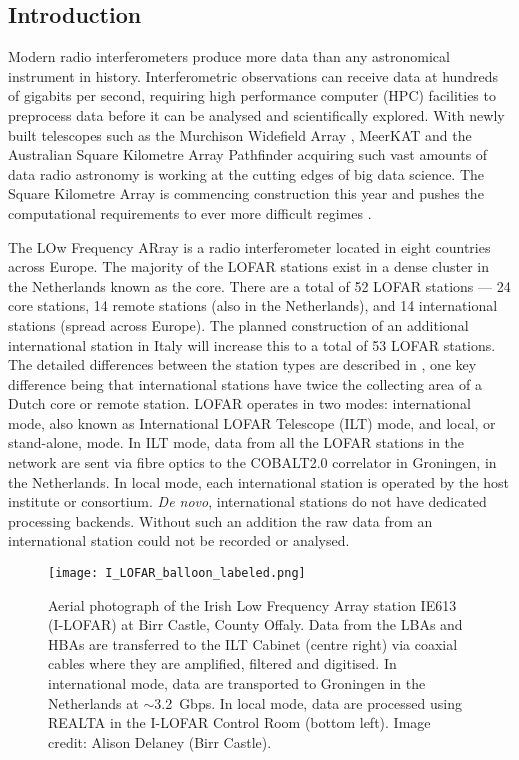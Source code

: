 
\subsection{Introduction}
\label{sec:intro}
Modern radio interferometers produce more data than any astronomical instrument in history. Interferometric observations can receive data at hundreds of gigabits per second, requiring high performance computer (HPC) facilities to preprocess data before it can be analysed and scientifically explored. With newly built telescopes such as the Murchison Widefield Array \citep[MWA;][]{Lonsdale2009}, MeerKAT \citep{Jonas2016} and the Australian Square Kilometre Array Pathfinder \citep[ASKAP;][]{Johnston2008} acquiring such vast amounts of data \citep[up to $300$~Gbps;][]{Voronkov2020, Lonsdale2009} radio astronomy is working at the cutting edges of big data science. The Square Kilometre Array \citep{McMullin2020} is commencing construction this year and pushes the computational requirements to ever more difficult regimes \citep{Scaife2020}.

The LOw Frequency ARray \citep[LOFAR;][]{VanHaarlem2013} is a radio interferometer located in eight countries across Europe. The majority of the LOFAR stations exist in a dense cluster in the Netherlands known as the core. There are a total of 52 LOFAR stations --- 24 core stations, 14 remote stations (also in the Netherlands), and 14 international stations (spread across Europe). The planned construction of an additional international station in Italy will increase this to a total of 53 LOFAR stations. The detailed differences between the station types are described in \cite{VanHaarlem2013}, one key difference being that international stations have twice the collecting area of a Dutch core or remote station. LOFAR operates in two modes: international mode, also known as International LOFAR Telescope (ILT) mode, and local, or stand-alone, mode. In ILT mode, data from all the LOFAR stations in the network are sent via fibre optics to the COBALT2.0 correlator \citep[an upgrade to COBALT1.0,][]{Broekema2018} in Groningen, in the Netherlands. In local mode, each international station is operated by the host institute or consortium. \textit{De novo}, international stations do not have dedicated processing backends. Without such an addition the raw data from an international station could not be recorded or analysed. 

\begin{figure*}[ht]
    \centering
    \texttt{[image: I\_LOFAR\_balloon\_labeled.png]}
    \caption[Aerial photograph of the Irish Low Frequency Array station IE613 (I-LOFAR) at Birr Castle, County Offaly.]{Aerial photograph of the Irish Low Frequency Array station IE613 (I-LOFAR) at Birr Castle, County Offaly. Data from the LBAs and HBAs are transferred to the ILT Cabinet (centre right) via coaxial cables where they are amplified, filtered and digitised. In international mode, data are transported to Groningen in the Netherlands at $\sim$3.2~Gbps. In local mode, data are processed using REALTA in the I-LOFAR Control Room (bottom left). Image credit: Alison Delaney (Birr Castle).}
    \label{fig:ILOFAR}
\end{figure*}

